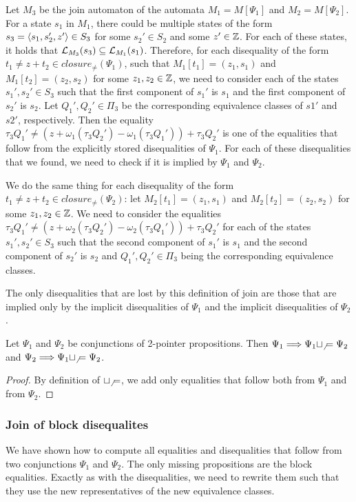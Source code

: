 Let $M_3$ be the join automaton of the automata $M_1 = M[\Psi_1]$ and $M_2 = M[\Psi_2]$.
For a state $s_1$ in $M_1$, there could be multiple states of the form $s_3 = \langle s_1, s_2', z'\rangle \in S_3$ for some $s_2' \in S_2$ and some $z' \in \mathbb{Z}$.
For each of these states, it holds that $\mathcal{L}_{M_3}(s_3) \subseteq \mathcal{L}_{M_1}(s_1)$.
Therefore, for each disequality of the form $t_1 \neq z + t_2 \in closure_\neq(\Psi_1)$, such that $M_1[t_1] = (z_1, s_1)$ and $M_1[t_2] = (z_2, s_2)$ for some $z_1,z_2\in \mathbb{Z}$, we need to consider
each of the states $s_1', s_2' \in S_3$ such that the first component of $s_1'$ is $s_1$ and the first component of $s_2'$ is $s_2$. Let $Q_1', Q_2' \in \Pi_3$ be the corresponding equivalence classes of $s1'$ and $s2'$, respectively.
Then the equality $\tau_3 Q_1' \neq (z + \omega_1 (\tau_3 Q_2') - \omega_1 (\tau_3 Q_1')) +\tau_3 Q_2'$ is one of the equalities that follow from the explicitly stored disequalities of $\Psi_1$.
For each of these disequalities that we found, we need to check if it is implied by $\Psi_1$ and $\Psi_2$.

We do the same thing for each disequality of the form $t_1 \neq z + t_2 \in closure_\neq(\Psi_2)$:
let $M_2[t_1] = (z_1, s_1)$ and $M_2[t_2] = (z_2, s_2)$ for some $z_1,z_2\in \mathbb{Z}$.
We need to consider the equalities $\tau_3 Q_1' \neq (z + \omega_2 (\tau_3 Q_2') - \omega_2 (\tau_3 Q_1')) +\tau_3 Q_2'$ for each of the states $s_1', s_2' \in S_3$ such that the second component of $s_1'$ is $s_1$ and the second component of $s_2'$ is $s_2$ and $Q_1', Q_2' \in \Pi_3$ being the corresponding equivalence classes.

The only disequalities that are lost by this definition of join are those that are implied only by the implicit disequalities of $\Psi_1$ and the implicit disequalities of $\Psi_2$.

\begin{proposition}
    Let $\Psi_1$ and $\Psi_2$ be conjunctions of 2-pointer propositions.
    Then $\Psi_1 \Longrightarrow \Psi_1 \sqcup_\neq \Psi_2$ and $\Psi_2 \Longrightarrow \Psi_1 \sqcup_\neq \Psi_2$.
\end{proposition}

\begin{proof}
    By definition of $\sqcup_\neq$, we add only equalities that follow both from $\Psi_1$ and from $\Psi_2$.
\end{proof}

\subsubsection{Join of block disequalites}
We have shown how to compute all equalities and disequalities that follow from two conjunctions $\Psi_1$ and $\Psi_2$.
The only missing propositions are the block equalities.
Exactly as with the disequalities, we need to rewrite them such that they use the new representatives of the new equivalence classes.

